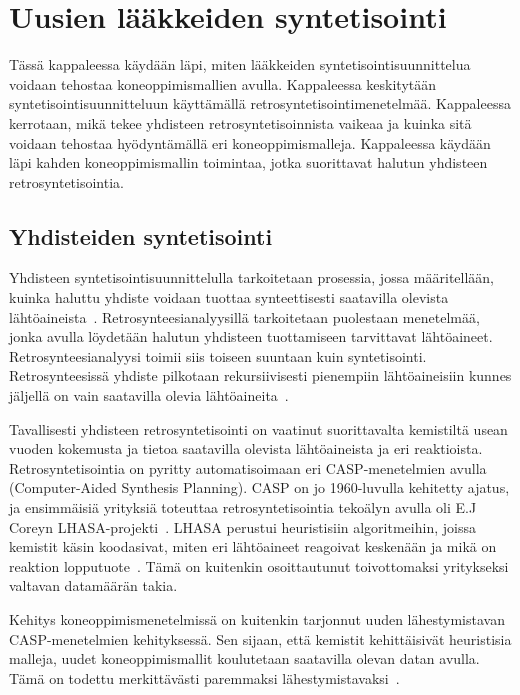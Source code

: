 \documentclass[finnish,twoside,censored,tkt,sw-line]{HYthesisML}
\begin{document}
\chapter{Uusien lääkkeiden syntetisointi}

Tässä kappaleessa käydään läpi, miten lääkkeiden syntetisointisuunnittelua voidaan tehostaa koneoppimismallien avulla.
Kappaleessa keskitytään syntetisointisuunnitteluun käyttämällä retrosyntetisointimenetelmää.
Kappaleessa kerrotaan, mikä tekee yhdisteen retrosyntetisoinnista vaikeaa ja kuinka sitä voidaan tehostaa hyödyntämällä eri koneoppimismalleja.
Kappaleessa käydään läpi kahden koneoppimismallin toimintaa, jotka suorittavat halutun yhdisteen retrosyntetisointia.

\section{Yhdisteiden syntetisointi}

Yhdisteen syntetisointisuunnittelulla tarkoitetaan prosessia, jossa määritellään, kuinka haluttu yhdiste voidaan tuottaa synteettisesti saatavilla olevista lähtöaineista~\cite{ColeyConnorW2018MLiC}.
Retrosynteesianalyysillä tarkoitetaan puolestaan menetelmää, jonka avulla löydetään halutun yhdisteen tuottamiseen tarvittavat lähtöaineet.
Retrosynteesianalyysi toimii siis toiseen suuntaan kuin syntetisointi.
Retrosynteesissä yhdiste pilkotaan rekursiivisesti pienempiin lähtöaineisiin kunnes jäljellä on vain saatavilla olevia lähtöaineita~\cite{ECoreyRetrosynthesis}.

Tavallisesti yhdisteen retrosyntetisointi on vaatinut suorittavalta kemistiltä usean vuoden kokemusta ja tietoa saatavilla olevista lähtöaineista ja eri reaktioista.
Retrosyntetisointia on pyritty automatisoimaan eri CASP-menetelmien avulla (Computer-Aided Synthesis Planning).
CASP on jo 1960-luvulla kehitetty ajatus, ja ensimmäisiä yrityksiä toteuttaa retrosyntetisointia tekoälyn avulla oli E.J Coreyn LHASA-projekti~\cite{ColeyConnorW2018MLiC}.
LHASA perustui heuristisiin algoritmeihin, joissa kemistit käsin koodasivat, miten eri lähtöaineet reagoivat keskenään ja mikä on reaktion lopputuote~\cite{LHASA}.
Tämä on kuitenkin osoittautunut toivottomaksi yritykseksi valtavan datamäärän takia.

Kehitys koneoppimismenetelmissä on kuitenkin tarjonnut uuden lähestymistavan CASP-menetelmien kehityksessä.
Sen sijaan, että kemistit kehittäisivät heuristisia malleja, uudet koneoppimismallit koulutetaan saatavilla olevan datan avulla.
Tämä on todettu merkittävästi paremmaksi lähestymistavaksi~\cite{ColeyConnorW2018MLiC}.
\end{document}
